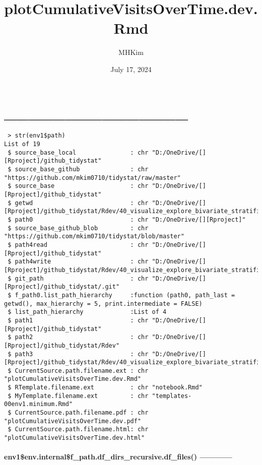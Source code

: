 \documentclass[
]{article}
\title{plotCumulativeVisitsOverTime.dev.Rmd}
\author{MHKim}
\date{July 17, 2024}
\begin{document}
\maketitle

{
\setcounter{tocdepth}{6}
\tableofcontents
}
\hypertarget{section}{%
\section{\_\_\_\_\_\_\_\_\_\_\_\_\_\_\_}\label{section}}

\begin{verbatim}
 > str(env1$path)
List of 19
 $ source_base_local               : chr "D:/OneDrive/[][Rproject]/github_tidystat"
 $ source_base_github              : chr "https://github.com/mkim0710/tidystat/raw/master"
 $ source_base                     : chr "D:/OneDrive/[][Rproject]/github_tidystat"
 $ getwd                           : chr "D:/OneDrive/[][Rproject]/github_tidystat/Rdev/40_visualize_explore_bivariate_stratified/49_time"
 $ path0                           : chr "D:/OneDrive/[][Rproject]"
 $ source_base_github_blob         : chr "https://github.com/mkim0710/tidystat/blob/master"
 $ path4read                       : chr "D:/OneDrive/[][Rproject]/github_tidystat"
 $ path4write                      : chr "D:/OneDrive/[][Rproject]/github_tidystat/Rdev/40_visualize_explore_bivariate_stratified/49_time"
 $ git_path                        : chr "D:/OneDrive/[][Rproject]/github_tidystat/.git"
 $ f_path0.list_path_hierarchy     :function (path0, path_last = getwd(), max_hierarchy = 5, print.intermediate = FALSE)  
 $ list_path_hierarchy             :List of 4
 $ path1                           : chr "D:/OneDrive/[][Rproject]/github_tidystat"
 $ path2                           : chr "D:/OneDrive/[][Rproject]/github_tidystat/Rdev"
 $ path3                           : chr "D:/OneDrive/[][Rproject]/github_tidystat/Rdev/40_visualize_explore_bivariate_stratified"
 $ CurrentSource.path.filename.ext : chr "plotCumulativeVisitsOverTime.dev.Rmd"
 $ RTemplate.filename.ext          : chr "notebook.Rmd"
 $ MyTemplate.filename.ext         : chr "templates-00env1.minimum.Rmd"
 $ CurrentSource.path.filename.pdf : chr "plotCumulativeVisitsOverTime.dev.pdf"
 $ CurrentSource.path.filename.html: chr "plotCumulativeVisitsOverTime.dev.html"
\end{verbatim}

\hypertarget{env1env.internalf_path.df_dirs_recursive.df_files}{%
\paragraph{env1\$env.internal\$f\_path.df\_dirs\_recursive.df\_files()
------------}\label{env1env.internalf_path.df_dirs_recursive.df_files}}
\end{document}
